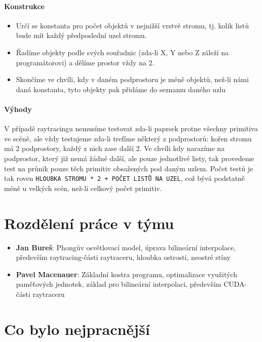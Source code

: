 \documentclass[11pt,a4paper]{article}
\begin{document}
\paragraph{Konstrukce}
\begin{itemize}
	\item Určí se konstanta pro počet objektů v nejnižší vrstvě stromu, tj. kolik listů bude mít každý předposlední uzel stromu.
	\item Řadíme objekty podle svých souřadnic (zda-li X, Y nebo Z záleží na programátorovi) a dělíme prostor vždy na 2.
	\item Skončíme ve chvíli, kdy v daném podprostoru je méně objektů, než-li námi daná konstanta, tyto objekty pak přidáme do seznamu daného uzlu
\end{itemize}

\paragraph{Výhody} V případě raytracingu nemusíme testovat zda-li paprsek protne všechny primitiva ve scéně, ale vždy testujeme zda-li trefíme některý z podprostorů: kořen stromu má 2 podprostory, každý z nich zase další 2. Ve chvíli kdy narazíme na podprostor, který již nemá žádné další, ale pouze jednotlivé listy, tak provedeme test na průnik pouze těch primitiv obsažených pod daným uzlem. Počet testů je tak roven \verb|HLOUBKA STROMU * 2 + POČET LISTŮ NA UZEL|, což bývá podstatně méně u velkých scén, než-li celkový počet primitiv.


\section{Rozdělení práce v týmu}

\begin{itemize}
\item \textbf{Jan Bureš}: Phongův osvětlovací model, úprava bilineární interpolace, především raytracing-části raytraceru, hloubka ostrosti, neostré stíny
\item \textbf{Pavel Macenauer}: Základní kostra programu, optimalizace využitých paměťových jednotek, základ pro bilineární interpolaci, především CUDA-části raytraceru 
\end{itemize}

\section{Co bylo nejpracnější}
\end{document}
